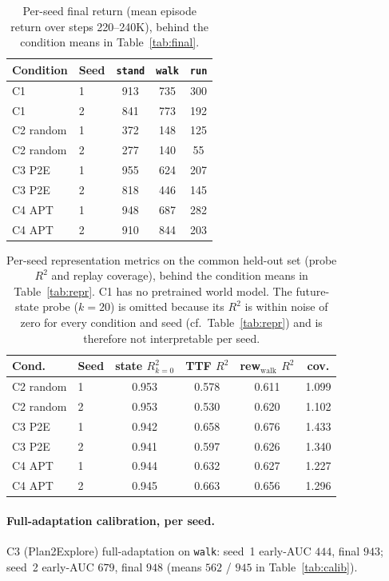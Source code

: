 \documentclass{article}
\begin{document}
\begin{table}[h]
\centering
\caption{Per-seed final return (mean episode return over steps 220--240K),
behind the condition means in Table~\ref{tab:final}.}
\label{tab:perseed-final}
\begin{tabular}{llccc}
\toprule
Condition & Seed & \texttt{stand} & \texttt{walk} & \texttt{run} \\
\midrule
C1 & 1 & 913 & 735 & 300 \\
C1 & 2 & 841 & 773 & 192 \\
C2 random & 1 & 372 & 148 & 125 \\
C2 random & 2 & 277 & 140 & 55 \\
C3 P2E & 1 & 955 & 624 & 207 \\
C3 P2E & 2 & 818 & 446 & 145 \\
C4 APT & 1 & 948 & 687 & 282 \\
C4 APT & 2 & 910 & 844 & 203 \\
\bottomrule
\end{tabular}
\end{table}

\begin{table}[h]
\centering
\caption{Per-seed representation metrics on the common held-out set (probe
$R^2$ and replay coverage), behind the condition means in Table~\ref{tab:repr}.
C1 has no pretrained world model. The future-state probe ($k{=}20$) is omitted
because its $R^2$ is within noise of zero for every condition and seed (cf.\
Table~\ref{tab:repr}) and is therefore not interpretable per seed.}
\label{tab:perseed-repr}
\small
\begin{tabular}{llcccc}
\toprule
Cond. & Seed & state $R^2_{k=0}$ & TTF $R^2$ & rew$_{\mathrm{walk}}$ $R^2$ & cov. \\
\midrule
C2 random & 1 & 0.953 & 0.578 & 0.611 & 1.099 \\
C2 random & 2 & 0.953 & 0.530 & 0.620 & 1.102 \\
C3 P2E & 1 & 0.942 & 0.658 & 0.676 & 1.433 \\
C3 P2E & 2 & 0.941 & 0.597 & 0.626 & 1.340 \\
C4 APT & 1 & 0.944 & 0.632 & 0.627 & 1.227 \\
C4 APT & 2 & 0.945 & 0.663 & 0.656 & 1.296 \\
\bottomrule
\end{tabular}
\end{table}

\paragraph{Full-adaptation calibration, per seed.} C3 (Plan2Explore)
full-adaptation on \texttt{walk}: seed~1 early-AUC $444$, final $943$; seed~2
early-AUC $679$, final $948$ (means $562$ / $945$ in Table~\ref{tab:calib}).
\end{document}
